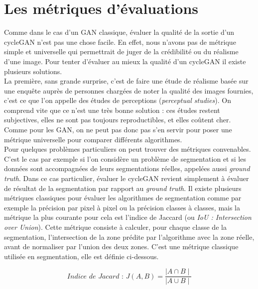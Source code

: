 \section{Les métriques d'évaluations}

Comme dans le cas d'un GAN classique, évaluer la qualité de la sortie d'un cycleGAN n'est pas une chose facile. En effet, nous n'avons pas de métrique simple et universelle qui permettrait de juger de la crédibilité ou du réalisme d'une image. Pour tenter d'évaluer au mieux la qualité d'un cycleGAN il existe plusieurs solutions.\\

La première, sans grande surprise, c'est de faire une étude de réalisme basée sur une enquête auprès de personnes chargées de noter la qualité des images fournies, c'est ce que l'on appelle des études de perceptions (\textit{perceptual studies}). On comprend vite que ce n'est une très bonne solution : ces études restent subjectives, elles ne sont pas toujours reproductibles, et elles coûtent cher. Comme pour les GAN, on ne peut pas donc pas s'en servir pour poser une métrique universelle pour comparer différents algorithmes.\\

Pour quelques problèmes particuliers on peut trouver des métriques convenables. C'est le cas par exemple si l'on considère un problème de segmentation et si les données sont accompagnées de leurs segmentations réelles, appelées aussi \textit{ground truth}. Dans ce cas particulier, évaluer le cycleGAN revient simplement à évaluer de résultat de la segmentation par rapport au \textit{ground truth}. Il existe plusieurs métriques classiques pour évaluer les algorithmes de segmentation comme par exemple la précision par pixel à pixel ou la précision classes à classes, mais la métrique la plus courante pour cela est l'indice de Jaccard (ou \textit{IoU : Intersection over Union}). Cette métrique consiste à calculer, pour chaque classe de la segmentation, l'intersection de la zone prédite par l'algorithme avec la zone réelle, avant de normaliser par l'union des deux zones. C'est une métrique classique utilisée en segmentation, elle est définie ci-dessous.

$$ \textit{Indice de Jacard : }J(A,B) = \frac{ \mid A \cap B \mid }{ \mid A \cup B \mid } $$


